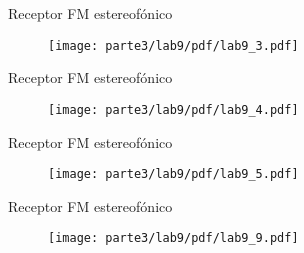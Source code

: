 \begin{frame}{Receptor FM estereofónico}

\begin{figure}[H]
\centering
\vspace{-3mm}
\texttt{[image: parte3/lab9/pdf/lab9\_3.pdf]}
\end{figure}

\end{frame}

\begin{frame}{Receptor FM estereofónico}

\begin{figure}[H]
\centering
\vspace{-3mm}
\texttt{[image: parte3/lab9/pdf/lab9\_4.pdf]}
\end{figure}

\end{frame}

\begin{frame}{Receptor FM estereofónico}

\begin{figure}[H]
\centering
\vspace{-3mm}
\texttt{[image: parte3/lab9/pdf/lab9\_5.pdf]}
\end{figure}

\end{frame}

\begin{frame}{Receptor FM estereofónico}

\begin{figure}[H]
\centering
\vspace{-3mm}
\texttt{[image: parte3/lab9/pdf/lab9\_9.pdf]}
\end{figure}

\end{frame}
